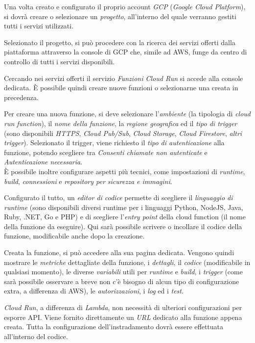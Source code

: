 Una volta creato e configurato il proprio account \textit{GCP} (\textit{Google Cloud Platform}), si dovrà creare o selezionare un \textit{progetto}, all'interno del quale verranno gestiti tutti i servizi utilizzati.

Selezionato il progetto, si può procedere con la ricerca dei servizi offerti dalla piattaforma attraverso la console di GCP che, simile ad AWS, funge da centro di controllo di tutti i servizi disponibili.

Cercando nei servizi offerti il servizio \textit{Funzioni Cloud Run} si accede alla console dedicata. È possibile quindi creare nuove funzioni o selezionarne una creata in precedenza.

Per creare una nuova funzione, si deve selezionare l'\textit{ambiente} (la tipologia di \textit{cloud run function}), il \textit{nome della funzione}, la \textit{regione geografica} ed il \textit{tipo di trigger} (sono disponibili \textit{HTTPS}, \textit{Cloud Pub/Sub}, \textit{Cloud Storage}, \textit{Cloud Firestore}, \textit{altri trigger}). Selezionato il trigger, viene richiesto il \textit{tipo di autenticazione} alla funzione, potendo scegliere tra \textit{Consenti chiamate non autenticate} e \textit{Autenticazione necessaria}.\\
È possibile inoltre configurare aspetti più tecnici, come impostazioni di \textit{runtime}, \textit{build}, \textit{connessioni} e \textit{repository per sicurezza e immagini}.

Configurato il tutto, un \textit{editor di codice} permette di scegliere il \textit{linguaggio di runtime} (sono disponibili diversi runtime per i linguaggi Python, NodeJS, Java, Ruby, .NET, Go e PHP) e di scegliere l'\textit{entry point} della cloud function (il nome della funzione da eseguire). Qui sarà possibile scrivere o incollare il codice della funzione, modificabile anche dopo la creazione.

Creata la funzione, si può accedere alla sua pagina dedicata. Vengono quindi mostrare le \textit{metriche} dettagliate della funzione, i \textit{dettagli}, il \textit{codice} (modificabile in qualsiasi momento), le diverse \textit{variabili} utili per \textit{runtime} e \textit{build}, i \textit{trigger} (come sarà possibile osservare a breve non c'è bisogno di alcun tipo di configurazione extra, a differenza di AWS), le \textit{autorizzazioni}, i \textit{log} ed i \textit{test}. 

\textit{Cloud Run}, a differenza di \textit{Lambda}, non necessità di ulteriori configurazioni per esporre API. Viene fornito direttamente un \textit{URL} dedicato alla funzione appena creata. Tutta la configurazione dell'instradamento dovrà essere effettuata all'interno del codice.
